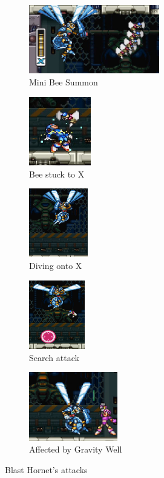\begin{figure}[htp]
	\centering
	\begin{subfigure}{0.48\linewidth}
		\centering
		\includegraphics[height=3cm]{figures/X3/Blast_hornet/Hornet_bees.jpg}
		\caption{Mini Bee Summon}
	\end{subfigure}
	\begin{subfigure}{0.3\linewidth}
		\centering
		\includegraphics[height=3cm]{figures/X3/Blast_hornet/Hornet_bees_2.jpg}
		\caption{Bee stuck to X}
	\end{subfigure}
		\begin{subfigure}{0.23\linewidth}
		\centering
		\includegraphics[height=3cm]{figures/X3/Blast_hornet/Hornet_dive.jpg}
		\caption{Diving onto X}
	\end{subfigure}
	\begin{subfigure}{0.23\linewidth}
		\centering
		\includegraphics[height=3cm]{figures/X3/Blast_hornet/Hornet_aim.jpg}
		\caption{Search attack}
	\end{subfigure}
		\begin{subfigure}{0.4\linewidth}
		\centering
		\includegraphics[height=3cm]{figures/X3/Blast_hornet/Hornet_gravity.jpg}
		\caption{Affected by Gravity Well}
	\end{subfigure}
	\caption{Blast Hornet's attacks}
\end{figure}
